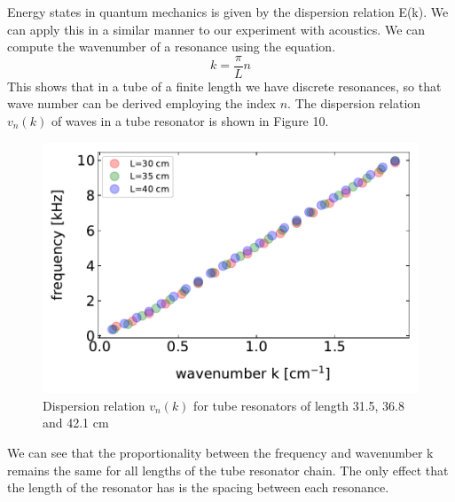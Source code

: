 \documentclass[12pt]{article}
\begin{document}
Energy states in quantum mechanics is given by the dispersion relation E(k). We can apply this in a similar manner to our experiment with acoustics. We can compute the wavenumber of a resonance using the equation.
\begin{equation}
	k = \frac{\pi}{L}n
\end{equation}
This shows that in a tube of a finite length we have discrete resonances, so that wave number can be derived employing the index $n$. The dispersion relation $v_n(k)$ of waves in a tube resonator is shown in Figure 10.
\begin{figure}[hbt]
	\caption{Dispersion relation $v_n(k)$ for tube resonators of length 31.5, 36.8 and 42.1 cm}
	\includegraphics[width = .5\textwidth]{results/k_for_all}
\end{figure}
We can see that the proportionality between the frequency and wavenumber k remains the same for all lengths of the tube resonator chain. The only effect that the length of the resonator has is the spacing between each resonance. 


\end{document}
